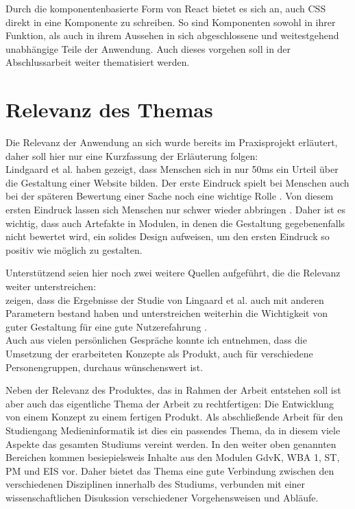 Durch die komponentenbasierte Form von React bietet es sich an, auch CSS direkt in eine Komponente zu schreiben. So sind Komponenten sowohl in ihrer Funktion, als auch in ihrem Aussehen in sich abgeschlossene und weitestgehend unabhängige Teile der Anwendung. Auch dieses vorgehen soll in der Abschlussarbeit weiter thematisiert werden.

\section{Relevanz des Themas}
Die Relevanz der Anwendung an sich wurde bereits im Praxisprojekt erläutert, daher soll hier nur eine Kurzfassung der Erläuterung folgen:\\
Lindgaard et al. \cite{lindgaard2006attention} haben gezeigt, dass Menschen sich in nur 50ms ein Urteil über die Gestaltung einer Website bilden. Der erste Eindruck spielt bei Menschen auch bei der späteren Bewertung einer Sache noch eine wichtige Rolle \cite{campbell1996fitting}. Von diesem ersten Eindruck lassen sich Menschen nur schwer wieder abbringen \cite{nickerson1998confirmation}.
Daher ist es wichtig, dass auch Artefakte in Modulen, in denen die Gestaltung gegebenenfalls nicht bewertet wird, ein solides Design aufweisen, um den ersten Eindruck so positiv wie möglich zu gestalten.

Unterstützend seien hier noch zwei weitere Quellen aufgeführt, die die Relevanz weiter unterstreichen:\\
\cite{tractinsky2006evaluating} zeigen, dass die Ergebnisse der Studie von Lingaard et al. auch mit anderen Parametern bestand haben und unterstreichen weiterhin die Wichtigkeit von guter Gestaltung für eine gute Nutzerefahrung \cite{tractinsky2000beautiful}.\\
Auch aus vielen persönlichen Gespräche konnte ich entnehmen, dass die Umsetzung der erarbeiteten Konzepte als Produkt, auch für verschiedene Personengruppen, durchaus wünschenswert ist.

Neben der Relevanz des Produktes, das in Rahmen der Arbeit entstehen soll ist aber auch das eigentliche Thema der Arbeit zu rechtfertigen: Die Entwicklung von einem Konzept zu einem fertigen Produkt.
Als abschließende Arbeit für den Studiengang Medieninformatik ist dies ein passendes Thema, da in diesem viele Aspekte das gesamten Studiums vereint werden. In den weiter oben genannten Bereichen kommen besiepielsweis Inhalte aus den Modulen GdvK, WBA 1, ST,  PM und EIS vor. Daher bietet das Thema eine gute Verbindung zwischen den verschiedenen Disziplinen innerhalb des Studiums, verbunden mit einer wissenschaftlichen Disukssion verschiedener Vorgehensweisen und Abläufe.


